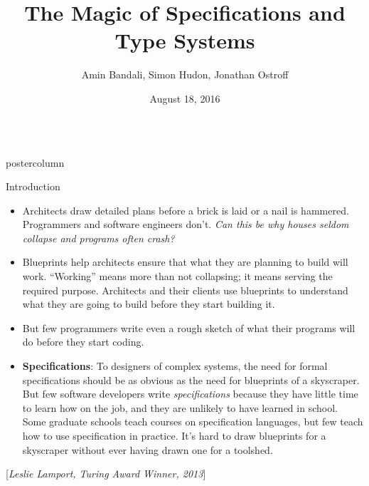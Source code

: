 \documentclass{beamer}
\title{\huge The Magic of Specifications and Type Systems}
\author{Amin Bandali, Simon Hudon, Jonathan Ostroff}
\institute[York University]{Software Engineering Lab, EECS}
\date{August 18, 2016}
\newlength{\columnheight}
\begin{document}
\begin{frame}
\begin{columns}
  \begin{column}{.3\textwidth}
    \begin{beamercolorbox}[center]{postercolumn}
      \begin{minipage}{.98\textwidth} %
        \parbox[t][\columnheight]{\textwidth}{ %
          \begin{myblock}{Introduction}
            \begin{itemize}
              \item Architects draw detailed plans before a brick is laid or a
                nail is hammered. Programmers and software engineers don't.
                \textit{Can this be why houses seldom collapse and programs
                  often crash?}

              \item Blueprints help architects ensure that what they are
                planning to build will work. ``Working'' means more than not
                collapsing; it means serving the required purpose. Architects
                and their clients use blueprints to understand what they are
                going to build before they start building it.

              \item But few programmers write even a rough sketch of what their
                programs will do before they start coding.

              \item \textbf{Specifications}: To designers of complex systems,
                the need for formal specifications should be as obvious as the
                need for blueprints of a skyscraper. But few software
                developers write \textit{specifications} because they have
                little time to learn how on the job, and they are unlikely to
                have learned in school. Some graduate schools teach courses on
                specification languages, but few teach how to use specification
                in practice. It's hard to draw blueprints for a skyscraper
                without ever having drawn one for a toolshed.
            \end{itemize}
            [\textit{Leslie Lamport, Turing Award Winner, 2013}]
            \bigskip


\end{myblock}}
\end{minipage}
\end{beamercolorbox}
\end{column}
\end{columns}
\end{frame}
\end{document}
